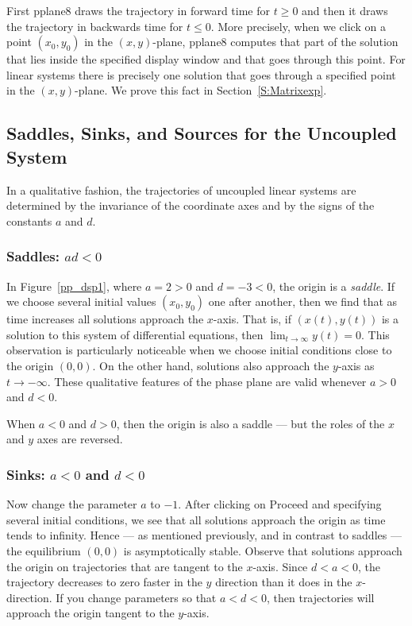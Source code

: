 \documentclass{ximera}
\begin{document}
First {\sf pplane8} draws the trajectory in forward time for
$t\ge 0$ and then it draws the trajectory in backwards time for
$t\le 0$.  More precisely, when we click on a point $(x_0,y_0)$ in
the $(x,y)$-plane, {\sf pplane8} computes that part of the
solution that lies inside the specified {\sf display window}
and that goes through this point.  For linear systems there is
precisely one solution that goes through a specified point in
the $(x,y)$-plane. We prove this fact in
Section~\ref{S:Matrixexp}.

\subsection*{Saddles, Sinks, and Sources for the Uncoupled System \protect{\eqref{lin2}}}

In a qualitative fashion, the trajectories of uncoupled linear
systems are determined by the invariance of the coordinate axes
and by the signs of the constants $a$ and $d$.

\subsubsection*{Saddles: $ad<0$} 

In Figure~\ref{pp_dsp1}, where $a=2>0$ and $d=-3<0$, the origin is a
{\em saddle\/}.  If we choose several initial values $(x_0,y_0)$
one after another,  then we find that as time increases all
solutions approach the $x$-axis.  That is, if $(x(t),y(t))$ is a 
solution to this system of differential equations, then 
$\lim_{t\to\infty}y(t)=0$.  This observation is particularly 
noticeable when we choose initial conditions close to the origin $(0,0)$.  
On the other hand, solutions also approach the $y$-axis as $t\to-\infty$.
These qualitative features of the phase plane are valid whenever 
$a>0$ and $d<0$.
 
When $a<0$ and $d>0$, then the origin is also a saddle ---
but the roles of the $x$ and $y$ axes are reversed.

\subsubsection*{Sinks: $a<0$ and $d<0$} 

Now change the parameter $a$ to $-1$. After clicking on {\sf
Proceed} and specifying several initial conditions, we see that
all solutions approach the origin as time tends to infinity.
Hence --- as mentioned previously, and in contrast to saddles ---
the equilibrium $(0,0)$ is asymptotically stable.  Observe that
solutions approach the origin on trajectories that are tangent to
the $x$-axis.  Since $d<a<0$, the trajectory decreases to zero faster
in the $y$ direction than it does in the $x$-direction.  If
you change parameters so that $a<d<0$, then trajectories will
approach the origin tangent to the $y$-axis.
\end{document}
